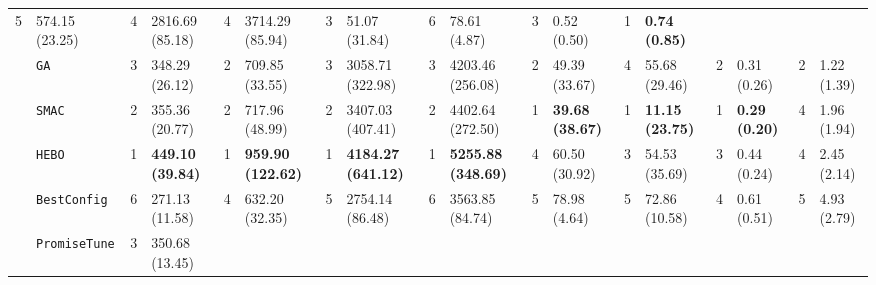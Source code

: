\begin{tabular}{clllllllllllllllll}
  5 &
  \multicolumn{1}{l|}{574.15 (23.25)} &
  4 &
  \multicolumn{1}{l|}{2816.69 (85.18)} &
  4 &
  \multicolumn{1}{l|}{3714.29 (85.94)} &
  3 &
  \multicolumn{1}{l|}{51.07 (31.84)} &
  6 &
  \multicolumn{1}{l|}{78.61 (4.87)} &
  3 &
  \multicolumn{1}{l|}{0.52 (0.50)} &
  \cellcolor{blue!15}1 &
  \cellcolor{blue!15}\textbf{0.74 (0.85)} \\
\multicolumn{1}{c|}{} &
  \multicolumn{1}{l|}{\texttt{GA}} &
  3 &
  \multicolumn{1}{l|}{348.29 (26.12)} &
  2 &
  \multicolumn{1}{l|}{709.85 (33.55)} &
  3 &
  \multicolumn{1}{l|}{3058.71 (322.98)} &
  3 &
  \multicolumn{1}{l|}{4203.46 (256.08)} &
  2 &
  \multicolumn{1}{l|}{49.39 (33.67)} &
  4 &
  \multicolumn{1}{l|}{55.68 (29.46)} &
  2 &
  \multicolumn{1}{l|}{0.31 (0.26)} &
  2 &
  1.22 (1.39) \\
\multicolumn{1}{c|}{} &
  \multicolumn{1}{l|}{\texttt{SMAC}} &
  2 &
  \multicolumn{1}{l|}{355.36 (20.77)} &
  2 &
  \multicolumn{1}{l|}{717.96 (48.99)} &
  2 &
  \multicolumn{1}{l|}{3407.03 (407.41)} &
  2 &
  \multicolumn{1}{l|}{4402.64 (272.50)} &
  \cellcolor{blue!15}1 &
  \multicolumn{1}{l|}{\cellcolor{blue!15}\textbf{39.68 (38.67)}} &
  \cellcolor{blue!15}1 &
  \multicolumn{1}{l|}{\cellcolor{blue!15}\textbf{11.15 (23.75)}} &
  \cellcolor{blue!15}1 &
  \multicolumn{1}{l|}{\cellcolor{blue!15}\textbf{0.29 (0.20)}} &
  4 &
  1.96 (1.94) \\
\multicolumn{1}{c|}{} &
  \multicolumn{1}{l|}{\texttt{HEBO}} &
  \cellcolor{blue!15}1 &
  \multicolumn{1}{l|}{\cellcolor{blue!15}\textbf{449.10 (39.84)}} &
  \cellcolor{blue!15}1 &
  \multicolumn{1}{l|}{\cellcolor{blue!15}\textbf{959.90 (122.62)}} &
  \cellcolor{blue!15}1 &
  \multicolumn{1}{l|}{\cellcolor{blue!15}\textbf{4184.27 (641.12)}} &
  \cellcolor{blue!15}1 &
  \multicolumn{1}{l|}{\cellcolor{blue!15}\textbf{5255.88 (348.69)}} &
  4 &
  \multicolumn{1}{l|}{60.50 (30.92)} &
  3 &
  \multicolumn{1}{l|}{54.53 (35.69)} &
  3 &
  \multicolumn{1}{l|}{0.44 (0.24)} &
  4 &
  2.45 (2.14) \\
\multicolumn{1}{c|}{} &
  \multicolumn{1}{l|}{\texttt{BestConfig}} &
  6 &
  \multicolumn{1}{l|}{271.13 (11.58)} &
  4 &
  \multicolumn{1}{l|}{632.20 (32.35)} &
  5 &
  \multicolumn{1}{l|}{2754.14 (86.48)} &
  6 &
  \multicolumn{1}{l|}{3563.85 (84.74)} &
  5 &
  \multicolumn{1}{l|}{78.98 (4.64)} &
  5 &
  \multicolumn{1}{l|}{72.86 (10.58)} &
  4 &
  \multicolumn{1}{l|}{0.61 (0.51)} &
  5 &
  4.93 (2.79) \\
\multicolumn{1}{c|}{} &
  \multicolumn{1}{l|}{\texttt{PromiseTune}} &
  3 &
  \multicolumn{1}{l|}{350.68 (13.45)} &

\end{tabular}
